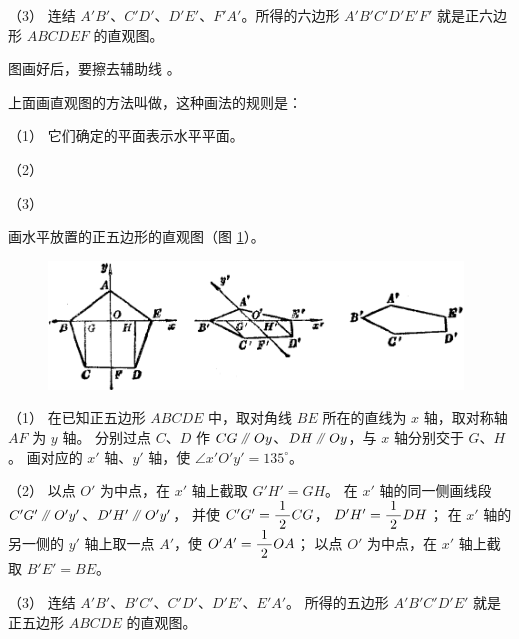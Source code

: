 \begin{enhancedline}
（3） 连结 $A'B'$、$C'D'$、$D'E'$、$F'A'$。所得的六边形 $A'B'C'D'E'F'$ 就是正六边形 $ABCDEF$ 的直观图。

\zhuyi 图画好后，要擦去辅助线 \footnotemark 。

上面画直观图的方法叫做，这种画法的规则是：

（1）
它们确定的平面表示水平平面。

（2）

（3）


\liti 画水平放置的正五边形的直观图（图 \ref{fig:ltjh-1-10}）。

\begin{figure}[htbp]
    \centering
    \includegraphics[width=11cm]{../pic/ltjh-ch1-10.png}
    \caption{}\label{fig:ltjh-1-10}
\end{figure}

\huafa（1） 在已知正五边形 $ABCDE$ 中，取对角线 $BE$ 所在的直线为 $x$ 轴，取对称轴 $AF$ 为 $y$ 轴。
分别过点 $C$、$D$ 作 $CG \pingxing Oy$、$DH \pingxing Oy$，与 $x$ 轴分别交于 $G$、$H$。
画对应的 $x'$ 轴、$y'$ 轴，使 $\angle x'O'y' = 135^\circ$。

（2） 以点 $O'$ 为中点，在 $x'$ 轴上截取 $G'H' = GH$。
在 $x'$ 轴的同一侧画线段 $C'G' \pingxing O'y'$、$D'H' \pingxing O'y'$，
并使 $C'G'= \dfrac{\; 1 \;}{2} CG$， $D'H' = \dfrac{\; 1 \;}{2} DH$；
在 $x'$ 轴的另一侧的 $y'$ 轴上取一点 $A'$，使 $O'A' = \dfrac{\; 1 \;}{2} OA$；
以点 $O'$ 为中点，在 $x'$ 轴上截取 $B'E' = BE$。

（3） 连结 $A'B'$、$B'C'$、$C'D'$、$D'E'$、$E'A'$。
所得的五边形 $A'B'C'D'E'$ 就是正五边形 $ABCDE$ 的直观图。



\begin{lianxi}


\end{lianxi}
\end{enhancedline}
